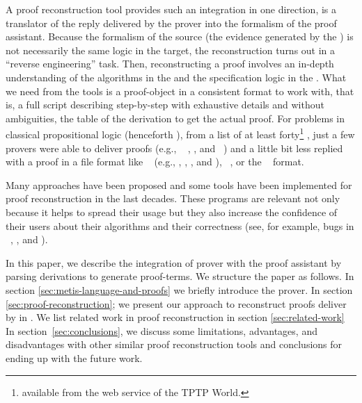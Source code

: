 \documentclass[../main.tex]{subfiles}
\begin{document}
A proof reconstruction tool provides such an integration in one direction,
is a translator of the reply delivered by the prover into the formalism of
the proof assistant. Because the formalism of the source (the evidence
generated by the \ATP) is not necessarily the same logic in the target, the
reconstruction turns out in a ``reverse engineering'' task.
Then, reconstructing a proof involves an in-depth understanding of the
algorithms in the \ATP and the specification logic in the \ITP.
What we need from the \ATP tools is a proof-object in a consistent format
to work with, that is, a full script describing step-by-step with
exhaustive details and without ambiguities, the table of the derivation
to get the actual proof. For problems in classical propositional logic
(henceforth \CPL), from a list of at least forty\footnote{\ATPs available
from the web service  of the TPTP World.} \ATPs, just
a few provers were able to deliver proofs (e.g., ~
\cite{Barrett2011}, , and ~\cite{hillenbrand1997})
and a little bit less replied with a proof in a file format like
\TSTP~\cite{sutcliffe2004tstp} (e.g., , \Metis,
, and ), ~\cite{Stump2008}, or the
~\cite{Bohme2011} format.

Many approaches have been proposed and some tools have been implemented
for proof reconstruction in the last decades. These programs are relevant
not only because it helps to spread their usage but they also increase
the confidence of their users about their algorithms and their
correctness (see, for example, bugs in \ATPs~\cite{Keller2013},
\cite{Bohme2011}, \cite{Fleury2014} and \cite{Kanso2012}).

In this paper, we describe the integration of \Metis prover with the
proof assistant \Agda by parsing \TSTP derivations to generate
\Agda proof-terms. We structure the paper as follows.
In section \ref{sec:metis-language-and-proofs} we briefly introduce
the \Metis prover. In section \ref{sec:proof-reconstruction}; we
present our approach to reconstruct proofs deliver by \Metis in
\Agda.
We list related work in proof reconstruction in section \ref{sec:related-work}
In section~\ref{sec:conclusions}, we discuss some limitations, advantages,
and disadvantages with other similar proof reconstruction tools and
conclusions for ending up with the future work.
\end{document}

